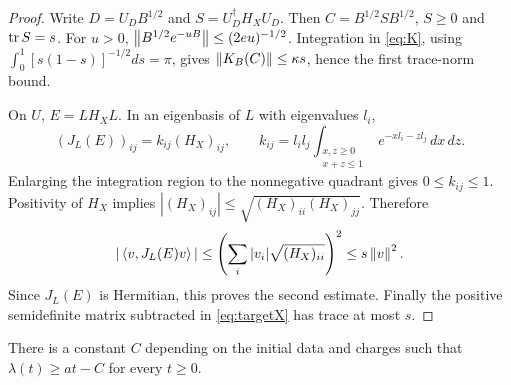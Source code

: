 \begin{proof}
Write $D=U_DB^{1/2}$ and $S=U_D^\dagger H_XU_D$. Then
$C=B^{1/2}SB^{1/2}$, $S\geq0$ and $\operatorname{tr} S=s$.
For $u>0$,
$\left\lVert B^{1/2}e^{-uB}\right\rVert\leq(2eu)^{-1/2}$.
Integration in \eqref{eq:K}, using
$\int_0^1[s(1-s)]^{-1/2}ds=\pi$, gives
$\left\lVert K_B(C)\right\rVert\leq\kappa s$, hence the first trace-norm bound.

On $U$, $E=LH_XL$. In an eigenbasis of $L$ with eigenvalues $l_i$,
\[
 (J_L(E))_{ij}=k_{ij}(H_X)_{ij},\qquad
 k_{ij}=l_il_j\int_{\substack{x,z\geq0\\x+z\leq1}}
                  e^{-xl_i-zl_j}\,dx\,dz .
\]
Enlarging the integration region to the nonnegative quadrant gives
$0\leq k_{ij}\leq1$. Positivity of $H_X$ implies
$|(H_X)_{ij}|\leq\sqrt{(H_X)_{ii}(H_X)_{jj}}$. Therefore
\[
 |\left\langle v,J_L(E)v\right\rangle|
 \leq\left(\sum_i|v_i|\sqrt{(H_X)_{ii}}\right)^2
 \leq s\left\lVert v\right\rVert^2.
\]
Since $J_L(E)$ is Hermitian, this proves the second estimate.
Finally the positive semidefinite matrix subtracted in
\eqref{eq:targetX} has trace at most $s$.
\end{proof}

\begin{lemma}\label{lem:growinggap}
There is a constant $C$ depending on the initial data and charges such
that $\lambda(t)\geq at-C$ for every $t\geq0$.
\end{lemma}

